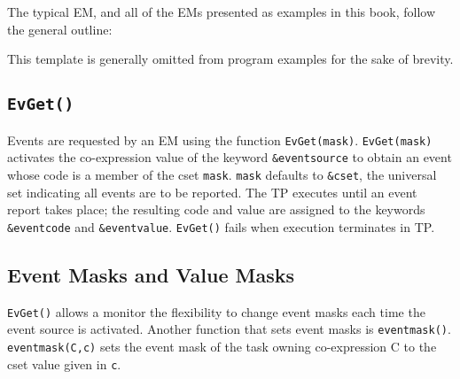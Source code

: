 The typical EM, and all of the EMs presented as examples in this
book, follow the general outline:
 

{}
\noindent This template is generally omitted from program examples for
the sake of brevity.

\subsection*{\tt EvGet()}

Events are requested by an EM using the function {\tt EvGet(mask)}.
{\tt EvGet(mask)} activates the co-expression value of the keyword 
{\tt \&eventsource} to obtain an event whose code is a member of the
cset {\tt mask}.
{\tt mask} defaults to {\tt \&cset}, the universal set indicating all events
are to be reported.
The TP executes until an event report takes place; the resulting code and
value are assigned to the keywords {\tt \&eventcode} and {\tt \&eventvalue}.
{\tt EvGet()} fails when execution terminates in TP.

\subsection*{Event Masks and Value Masks}

{\tt EvGet()} allows a monitor the flexibility to change event masks each
time the event source is activated.  Another function that sets event masks
is {\tt eventmask()}.  {\tt eventmask(C,c)} sets the event mask of the task
owning co-expression C to the cset value given in {\tt c}.

